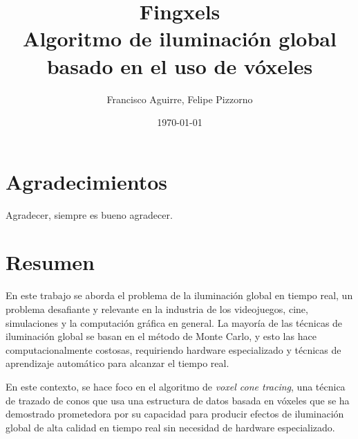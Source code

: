 \documentclass{prgrado}
\title{
	Fingxels \\
	\large Algoritmo de iluminación global basado en el uso de vóxeles
}
\author{Francisco Aguirre, Felipe Pizzorno}
\date{\today} %
\begin{document}

\frontmatter %

\maketitle


\chapter*{Agradecimientos}

Agradecer, siempre es bueno agradecer. %


\chapter*{Resumen}


En este trabajo se aborda el problema de la iluminación global en tiempo real, un problema desafiante y relevante en la industria de los videojuegos, cine, simulaciones y la computación gráfica en general.
La mayoría de las técnicas de iluminación global se basan en el método de Monte Carlo, y esto las hace computacionalmente costosas, requiriendo hardware especializado y técnicas de aprendizaje automático para alcanzar el tiempo real.

En este contexto, se hace foco en el algoritmo de \textit{voxel cone tracing}, una técnica de trazado de conos que usa una estructura de datos basada en vóxeles que se ha demostrado prometedora por su capacidad para producir efectos de iluminación global de alta calidad en tiempo real sin necesidad de hardware especializado.
\end{document}
